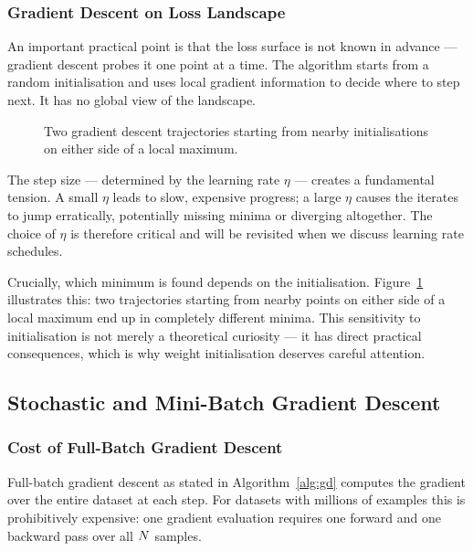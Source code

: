 \subsubsection{Gradient Descent on Loss Landscape}
\label{sec:gd_landscape}

An important practical point is that the loss surface is not known in advance — gradient descent probes it one point at a time. The algorithm starts from a random initialisation and uses local gradient information to decide where to step next. It has no global view of the landscape.

\begin{figure}
\centering
{}
\resizebox{0.40\textwidth}{!}{}
\caption{Two gradient descent trajectories starting from nearby initialisations on either side of a local maximum.}
\label{fig:gd_descent_steps}
\end{figure}

The step size — determined by the learning rate $\eta$ — creates a fundamental tension. A small $\eta$ leads to slow, expensive progress; a large $\eta$ causes the iterates to jump erratically, potentially missing minima or diverging altogether. The choice of $\eta$ is therefore critical and will be revisited when we discuss learning rate schedules.

Crucially, which minimum is found depends on the initialisation. Figure~\ref{fig:gd_descent_steps} illustrates this: two trajectories starting from nearby points on either side of a local maximum end up in completely different minima. This sensitivity to initialisation is not merely a theoretical curiosity — it has direct practical consequences, which is why weight initialisation deserves careful attention.

\subsection{Stochastic and Mini-Batch Gradient Descent}

\subsubsection{Cost of Full-Batch Gradient Descent}

Full-batch gradient descent as stated in Algorithm~\ref{alg:gd} computes the gradient over the entire dataset at each step. For datasets with millions of examples this is prohibitively expensive: one gradient evaluation requires one forward and one backward pass over all $N$ samples.


